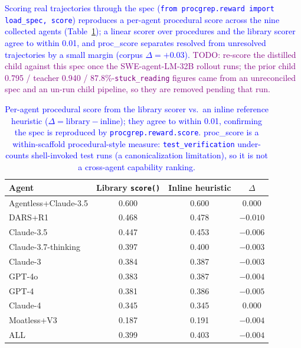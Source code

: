 \documentclass[12pt]{article}
\begin{document}
\textcolor{blue}{Scoring real trajectories through the spec (\texttt{from procgrep.reward import load\_spec, score}) reproduces a per-agent procedural score across the nine collected agents (Table~\ref{tab:score-vs-heuristic}); a linear scorer over procedures and the library scorer agree to within 0.01, and proc\_score separates resolved from unresolved trajectories by a small margin (corpus $\Delta = +0.03$).} \textcolor{purple}{TODO: re-score the distilled child against this spec once the SWE-agent-LM-32B rollout runs; the prior child 0.795 / teacher 0.940 / 87.8\%-\texttt{stuck\_reading} figures came from an unreconciled spec and an un-run child pipeline, so they are removed pending that run.}

\begin{table}[H]
  \centering
  \begin{tabular}{lccc}
    \toprule
    Agent & Library \texttt{score()} & Inline heuristic & $\Delta$ \\
    \midrule
    Agentless+Claude-3.5 & 0.600 & 0.600 & $0.000$ \\
    DARS+R1              & 0.468 & 0.478 & $-0.010$ \\
    Claude-3.5           & 0.447 & 0.453 & $-0.006$ \\
    Claude-3.7-thinking  & 0.397 & 0.400 & $-0.003$ \\
    Claude-3             & 0.384 & 0.387 & $-0.003$ \\
    GPT-4o               & 0.383 & 0.387 & $-0.004$ \\
    GPT-4                & 0.381 & 0.386 & $-0.005$ \\
    Claude-4             & 0.345 & 0.345 & $0.000$ \\
    Moatless+V3          & 0.187 & 0.191 & $-0.004$ \\
    \midrule
    ALL                  & 0.399 & 0.403 & $-0.004$ \\
    \bottomrule
  \end{tabular}
  \caption{\textcolor{blue}{Per-agent procedural score from the library scorer vs.\ an inline reference heuristic ($\Delta = \text{library} - \text{inline}$); they agree to within 0.01, confirming the spec is reproduced by \texttt{procgrep.reward.score}. proc\_score is a within-scaffold procedural-style measure: \texttt{test\_verification} under-counts shell-invoked test runs (a canonicalization limitation), so it is not a cross-agent capability ranking.}}
  \label{tab:score-vs-heuristic}
\end{table}
\end{document}
